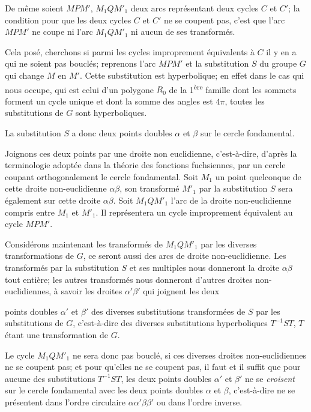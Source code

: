 \documentclass{article}
\begin{document}
De même soient $MPM'$, $M_{1}QM'_{1}$ deux arcs représentant deux cycles $C$ et $C'$; la condition pour que les deux cycles $C$ et $C'$ ne se coupent pas, c'est que l'arc $MPM'$ ne coupe ni l'arc $M_{1}QM'_{1}$ ni aucun de ses transformés.

Cela posé, cherchons si parmi les cycles improprement équivalents à $C$ il y en a qui ne soient pas bouclés; reprenons l'arc $MPM'$ et la substitution $S$ du groupe $G$ qui change $M$ en $M'$. Cette substitution est hyperbolique; en effet dans le cas qui nous occupe, qui est celui d'un polygone $R_{0}$ de la 1\textsuperscript{ère} famille dont les sommets forment un cycle unique et dont la somme des angles est $4\pi$, toutes les substitutions de $G$ sont hyperboliques.

La substitution $S$ a donc deux points doubles $\alpha$ et $\beta$ sur le cercle fondamental.

Joignons ces deux points par une droite non euclidienne, c'est-à-dire, d'après la terminologie adoptée dans la théorie des fonctions fuchsiennes, par un cercle coupant orthogonalement le cercle fondamental. Soit $M_{1}$ un point quelconque de cette droite non-euclidienne $\alpha\beta$, son transformé $M'_{1}$ par la substitution $S$ sera également sur cette droite $\alpha\beta$. Soit $M_{1}QM'_{1}$ l'arc de la droite non-euclidienne compris entre $M_{1}$ et $M'_{1}$. Il représentera un cycle improprement équivalent au cycle $MPM'$.

Considérons maintenant les transformés de $M_{1}QM'_{1}$ par les diverses transformations de $G$, ce seront aussi des arcs de droite non-euclidienne. Les transformés par la substitution $S$ et ses multiples nous donneront la droite $\alpha\beta$ tout entière; les autres transformés nous donneront d'autres droites non-euclidiennes, à savoir les droites $\alpha'\beta'$ qui joignent les deux

points doubles $\alpha'$ et $\beta'$ des diverses substitutions transformées de $S$ par les substitutions de $G$, c'est-à-dire des diverses substitutions hyperboliques $T^{-1}ST$, $T$ étant une transformation de $G$.

Le cycle $M_{1}QM'_{1}$ ne sera donc pas bouclé, si ces diverses droites non-euclidiennes ne se coupent pas; et pour qu'elles ne se coupent pas, il faut et il suffit que pour aucune des substitutions $T^{-1}ST$, les deux points doubles $\alpha'$ et $\beta'$ ne se \emph{croisent} sur le cercle fondamental avec les deux points doubles $\alpha$ et $\beta$, c'est-à-dire ne se présentent dans l'ordre circulaire $\alpha\alpha'\beta\beta'$ ou dans l'ordre inverse.
\end{document}
